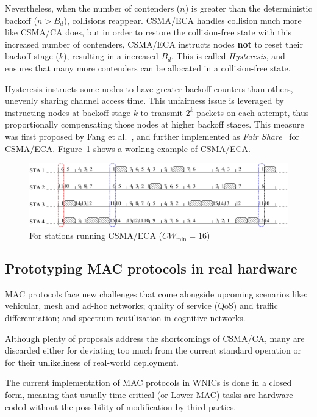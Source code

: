 Nevertheless, when the number of contenders ($n$) is greater than the deterministic backoff ($n>B_{d}$), collisions reappear. CSMA/ECA handles collision much more like CSMA/CA does, but in order to restore the collision-free state with this increased number of contenders, CSMA/ECA instructs nodes {\bfseries not} to reset their backoff stage ($k$), resulting in a increased $B_{d}$. This is called \emph{Hysteresis}, and ensures that many more contenders can be allocated in a collision-free state.

Hysteresis instructs some nodes to have greater backoff counters than others, unevenly sharing channel access time. This unfairness issue is leveraged by instructing nodes at backoff stage $k$ to transmit $2^{k}$ packets on each attempt, thus proportionally compensating those nodes at higher backoff stages. This measure was first proposed by Fang et al.~\cite{L_MAC2}, and further implemented as \emph{Fair Share}~\cite{research2standards} for CSMA/ECA. Figure~\ref{fig:csmaECA} shows a working example of CSMA/ECA.

\begin{figure}[htbp]
  \centering
  \includegraphics[width=\linewidth]{csma_eca_different_backoff_short.eps}
  \caption{For stations running CSMA/ECA ($CW_{\min}=16$)
  \label{fig:csmaECA}}
\end{figure}

\subsection{Prototyping MAC protocols in real hardware}
MAC protocols face new challenges that come alongside upcoming scenarios like: vehicular, mesh and ad-hoc networks; quality of service (QoS) and traffic differentiation; and spectrum reutilization in cognitive networks. 

Although plenty of proposals address the shortcomings of CSMA/CA, many are discarded either for deviating too much from the current standard operation or for their unlikeliness of real-world deployment.


The current implementation of MAC protocols in WNICs is done in a closed form, meaning that usually time-critical (or Lower-MAC) tasks are hardware-coded without the possibility of modification by third-parties.

